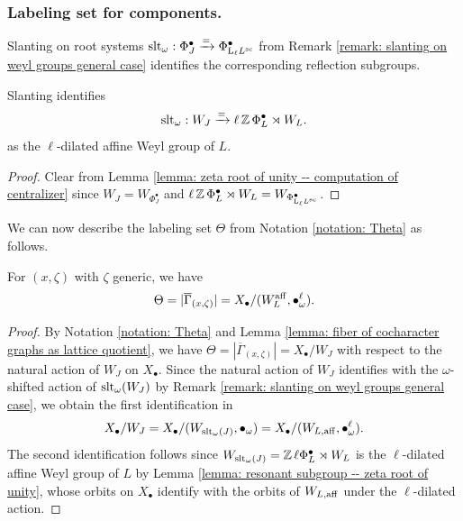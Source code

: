 \subsubsection{Labeling set for components.}
Slanting on root systems $\operatorname{slt}_{\omega}: \Phi^{\bullet}_J \xrightarrow{=} \Phi^{\bullet}_{\mathrm{L}_{\ell} L^{\mathrm{sc}}}$ from Remark \ref{remark: slanting on weyl groups general case} identifies the corresponding reflection subgroups.
\begin{lemma}\label{lemma: resonant subgroup -- zeta root of unity}
Slanting identifies
\begin{equation*}
    \operatorname{slt}_{\omega}: W_J \xrightarrow{=} \ell \operatorname{\mathbb{Z}}\Phi^{\bullet}_L \rtimes W_L.
\end{equation*}
as the $\ell$-dilated affine Weyl group of $L$.
\end{lemma}
\begin{proof}
Clear from Lemma \ref{lemma: zeta root of unity -- computation of centralizer} since $W_J = W_{\Phi^{\bullet}_J}$ and $\ell \operatorname{\mathbb{Z}}\Phi^{\bullet}_L \rtimes W_L = W_{\Phi^{\bullet}_{\mathrm{L}_{\ell} L^{\mathrm{sc}}}}$.   
\end{proof}


We can now describe the labeling set $\Theta$ from Notation \ref{notation: Theta} as follows.
\begin{lemma}\label{lemma: labeling set for components -- zeta root of unity}
For $(x, \zeta)$ with $\zeta$ generic, we have
\begin{equation*}
 \Theta = |\overline{\Gamma}_{(x, \zeta)}| = X_{\bullet} / (W^{\mathrm{aff}}_{L}, \bullet^{\ell}_{\omega}).
\end{equation*}
\end{lemma}
\begin{proof}
 By Notation \ref{notation: Theta} and Lemma \ref{lemma: fiber of cocharacter graphs as lattice quotient}, we have $\Theta = |\overline{\Gamma}_{(x, \zeta)}|  = X_{\bullet}/W_J$ with respect to the natural action of $W_J$ on $X_{\bullet}$. 
%
Since the natural action of $W_J$ identifies with the $\omega$-shifted action of $\operatorname{slt}_{\omega}(W_J)$ by Remark \ref{remark: slanting on weyl groups general case}, we obtain the first identification in
 \begin{equation*}
     X_{\bullet}/W_J 
     = X_{\bullet}/(W_{\operatorname{slt}_{\omega}(J)}, \bullet_{\omega}) 
     = X_{\bullet}/(W_{L, \mathrm{aff}}, \bullet^{\ell}_{\omega}). 
 \end{equation*}
 The second identification follows since $W_{\operatorname{slt}_{\omega}(J)} = \operatorname{\mathbb{Z}}\ell\Phi^{\bullet}_L \rtimes W_L$ is the $\ell$-dilated affine Weyl group of $L$ by Lemma \ref{lemma: resonant subgroup -- zeta root of unity}, whose orbits on $X_{\bullet}$ identify with the orbits of $W_{L, \mathrm{aff}}$ under the $\ell$-dilated action.
\end{proof}

